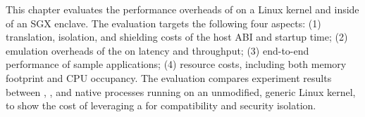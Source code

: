 This chapter evaluates the performance overheads of \graphene{}
on a Linux kernel and inside of an SGX enclave.
The evaluation
targets the following four aspects:
(1) translation, isolation, and shielding costs of the host ABI and startup time;
(2) emulation overheads of the \libos{} on \linuxapis{} latency and throughput;
(3) end-to-end performance of sample applications;
(4) resource costs, including both memory footprint and CPU occupancy.
The evaluation compares experiment results
between \graphene{}, \graphenesgx{}, and native processes running on an unmodified, generic Linux kernel,
to show the cost of leveraging a \libos{} for compatibility and security isolation.










